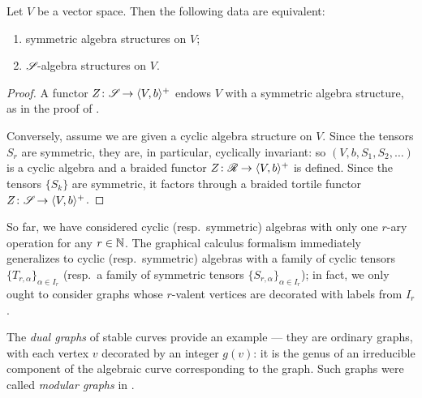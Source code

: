 \begin{theorem}\label{thm:gc-sym}
  Let $V$ be a vector space. Then the following data are equivalent:
  \begin{enumerate}
  \item symmetric algebra structures on $V$;
  \item $\mathscr{S}_{}$-algebra structures on $V$.
  \end{enumerate}
\end{theorem}
\begin{proof}
  A functor $Z\colon\mathscr{S}_{}\to\langle V,b\rangle^+$ endows $V$ with a symmetric algebra
  structure, as in the proof of .
  
  Conversely, assume we are given a cyclic algebra structure on $V$.
  Since the tensors $S_r$ are symmetric, they are, in particular,
  cyclically invariant: so $(V,b,S_1,S_2,\dots)$ is a cyclic algebra
  and a braided functor $Z\colon\mathscr{R}_{}\to\langle V,b\rangle^+$ is defined.  Since the
  tensors $\{S_k\}$ are symmetric, it factors through a braided
  tortile functor $Z\colon\mathscr{S}_{}\to\langle V,b\rangle^+$.
\end{proof}
\begin{remark}
  \label{rem:many-sorted-graphs}
  So far, we have considered cyclic (resp.\ symmetric) algebras with
  only one $r$-ary operation for any $r\in\mathbb{N}$. The graphical calculus
  formalism immediately generalizes to cyclic (resp.\ symmetric)
  algebras with a family of cyclic tensors $\{T_{r,\alpha}\}_{\alpha\in
    I_r}$
  (resp.\ a family of symmetric tensors $\{S_{r,\alpha}\}_{\alpha\in
    I_r}$);
  in fact, we only ought to consider graphs whose $r$-valent vertices
  are decorated with labels from $I_r$.

  The \emph{dual graphs} of stable curves \cite{deligne-mumford} provide
  an example --- they are ordinary graphs, with each vertex $v$
  decorated by an integer $g(v)$: it is the genus of an irreducible
  component of the algebraic curve corresponding to the graph. Such
  graphs were called \emph{modular graphs} in \cite{getzler-kapranov}.
\end{remark}

